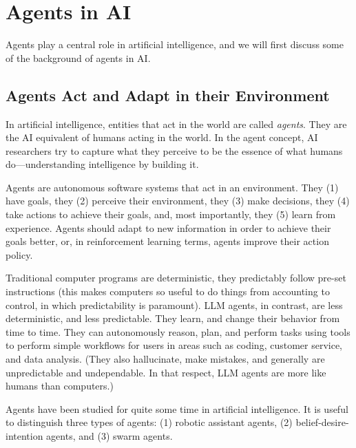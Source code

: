 \section{Agents in AI}
Agents play a central role in artificial intelligence, and we will first discuss some of the background of agents in AI. %

\subsection{Agents Act and Adapt in their Environment}
In artificial intelligence, entities that  act in the world are called {\em agents}. They are the AI equivalent of humans acting in the  world. In the  agent concept, AI researchers try to capture what they perceive to be the essence of what humans do---understanding intelligence by building it. 

Agents are autonomous software systems that act in an environment. They (1) have goals,  they (2) perceive their environment, they (3)  make decisions, they (4)  take actions to achieve their goals, and, most importantly, they (5)  learn from experience. 
Agents should  adapt to new information in order to achieve their goals better, or, in reinforcement learning terms, agents improve their action policy.

Traditional computer programs are deterministic, they predictably follow pre-set instructions (this makes computers so useful to do things from accounting to control, in which predictability is paramount). LLM agents, in contrast, are less deterministic, and less predictable. %
They learn, and  change their behavior from time to time. They can autonomously reason, plan, and perform tasks using tools to perform simple workflows for users in areas such as coding, customer service, and data analysis. (They also hallucinate, make mistakes, and generally are unpredictable and undependable. In that respect, LLM agents are more like humans than computers.)

Agents have been studied for quite some time in artificial intelligence.
It is useful to distinguish  three types of agents: (1) robotic assistant agents, (2) belief-desire-intention agents, and (3) swarm agents. 

